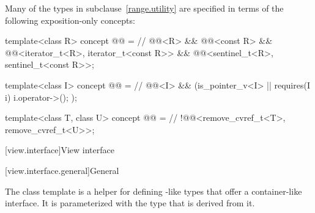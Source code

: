 \pnum
Many of the types in subclause~\ref{range.utility} are specified in terms of
the following exposition-only concepts:
\begin{codeblock}
template<class R>
  concept @@ =                                     // \expos
    @@<R> && @@<const R> &&
    @@<iterator_t<R>, iterator_t<const R>> &&
    @@<sentinel_t<R>, sentinel_t<const R>>;

template<class I>
  concept @@ =                                       // \expos
    @@<I> && (is_pointer_v<I> || requires(I i) { i.operator->(); });

template<class T, class U>
  concept @@ =                                  // \expos
    !@@<remove_cvref_t<T>, remove_cvref_t<U>>;
\end{codeblock}

[view.interface]{View interface}

[view.interface.general]{General}

\pnum
The class template  is a helper for defining
-like types that offer a container-like interface. It is
parameterized with the type that is derived from it.


